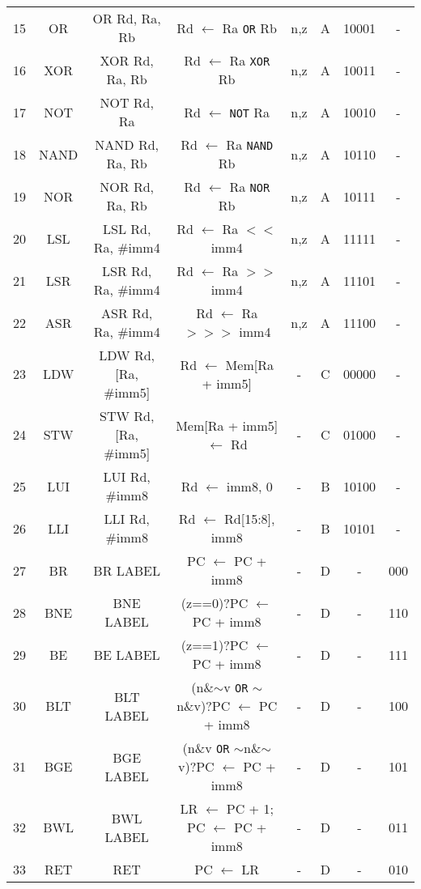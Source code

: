 \begin{table}[t]
{\begin{tabular}{r|c|c|c|c|c|c|c|}
	15& OR    & OR Rd, Ra, Rb       & Rd $\leftarrow$ Ra \texttt{OR} Rb      & n,z     & A & 10001 & - \\
	16& XOR   & XOR Rd, Ra, Rb      & Rd $\leftarrow$ Ra \texttt{XOR} Rb     & n,z     & A & 10011 & - \\
	17& NOT   & NOT Rd, Ra          & Rd $\leftarrow$ \texttt{NOT} Ra        & n,z     & A & 10010 & - \\
	18& NAND  & NAND Rd, Ra, Rb     & Rd $\leftarrow$ Ra \texttt{NAND} Rb    & n,z     & A & 10110 & - \\
	19& NOR   & NOR Rd, Ra, Rb      & Rd $\leftarrow$ Ra \texttt{NOR} Rb     & n,z     & A & 10111 & - \\
	20& LSL   & LSL Rd, Ra, \#imm4  & Rd $\leftarrow$ Ra $<<$ imm4  & n,z     & A & 11111 & - \\
	21& LSR   & LSR Rd, Ra, \#imm4  & Rd $\leftarrow$ Ra $>>$ imm4  & n,z     & A & 11101 & - \\
	22& ASR   & ASR Rd, Ra, \#imm4  & Rd $\leftarrow$ Ra $>>>$ imm4 & n,z     & A & 11100 & - \\
	23& LDW   & LDW Rd, [Ra, \#imm5]& Rd $\leftarrow$ Mem[Ra + imm5]& -       & C & 00000 & - \\
	24& STW   & STW Rd, [Ra, \#imm5]& Mem[Ra + imm5] $\leftarrow$ Rd& -       & C & 01000 & - \\
	25& LUI   & LUI Rd, \#imm8      & Rd $\leftarrow$ {imm8, 0}     & -       & B & 10100 & - \\
	26& LLI   & LLI Rd, \#imm8      & Rd $\leftarrow$ {Rd[15:8], imm8}& -     & B & 10101 & - \\
	27& BR    & BR LABEL            & PC $\leftarrow$ PC + imm8     & -       & D & - & 000 \\
	28& BNE   & BNE LABEL           & (z==0)?PC $\leftarrow$ PC + imm8& -     & D & - & 110 \\
	29& BE    & BE LABEL            & (z==1)?PC $\leftarrow$ PC + imm8& -     & D & - & 111 \\
	30& BLT   & BLT LABEL           & (n\&$\sim$v \texttt{OR} $\sim$n\&v)?PC $\leftarrow$ PC + imm8& - & D & - & 100 \\
	31& BGE   & BGE LABEL           & (n\&v \texttt{OR} $\sim$n\&$\sim$v)?PC $\leftarrow$ PC + imm8& - & D & - & 101 \\
	32& BWL   & BWL LABEL           & LR $\leftarrow$ PC + 1; PC $\leftarrow$ PC + imm8& - & D & - & 011 \\
	33& RET   & RET                 & PC $\leftarrow$ LR            & -       & D & -     & 010 \\

\end{tabular}}
\end{table}
